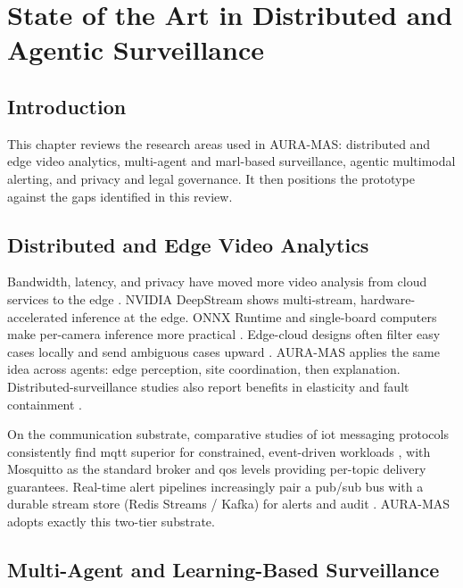 \chapter{State of the Art in Distributed and Agentic Surveillance}
\label{chap:sota}

\section{Introduction}

This chapter reviews the research areas used in AURA-MAS: distributed and edge video analytics, multi-agent and \gls{marl}-based surveillance, agentic multimodal alerting, and privacy and legal governance. It then positions the prototype against the gaps identified in this review.

\section{Distributed and Edge Video Analytics}

Bandwidth, latency, and privacy have moved more video analysis from cloud services to the edge \cite{do2025survey, toshpulatov2024edge}. NVIDIA DeepStream \cite{nvidia2024deepstream} shows multi-stream, hardware-accelerated inference at the edge. ONNX Runtime \cite{kacar2024onnx} and single-board computers make per-camera inference more practical \cite{sbc2024review}. Edge-cloud designs often filter easy cases locally and send ambiguous cases upward \cite{ghasemi2024edgecloudai}. AURA-MAS applies the same idea across agents: edge perception, site coordination, then explanation. Distributed-surveillance studies also report benefits in elasticity and fault containment \cite{sada2019distributed, karim2024real}.

On the communication substrate, comparative studies of \gls{iot} messaging protocols consistently find \gls{mqtt} superior for constrained, event-driven workloads \cite{zhang2024comparison, almanasrah2026message, arafat2025nextgen}, with Mosquitto as the standard broker \cite{light2017mosquitto} and \gls{qos} levels providing per-topic delivery guarantees. Real-time alert pipelines increasingly pair a pub/sub bus with a durable stream store (Redis Streams / Kafka) for alerts and audit \cite{melancon2026blazeaiot, gulotta2023realtime, yoshino2025high}. AURA-MAS adopts exactly this two-tier substrate.

\section{Multi-Agent and Learning-Based Surveillance}

